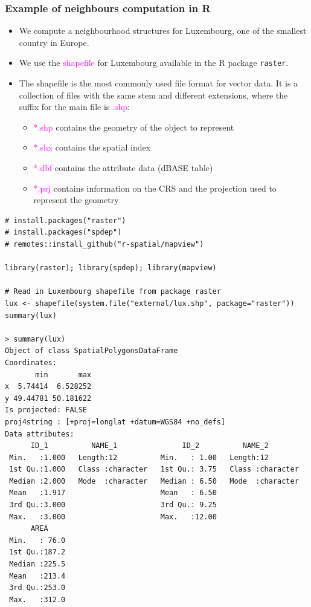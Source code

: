 \documentclass[12pt]{beamer}
\begin{document}
\begin{frame} [fragile]
\frametitle{Example of neighbours computation in R}
 \begin{itemize} \setlength\itemsep{\fill}
\item We compute a neighbourhood structures for Luxembourg, one of the smallest country in Europe.
\item We use the \textcolor{magenta}{shapefile} for Luxembourg available in the R package \texttt{raster}.
\item \normalsize The shapefile is the most commonly used file format for vector data. It is a collection of files with the same stem and different extensions, where the suffix for the main file is \textcolor{magenta}{.shp}:
  \begin{itemize} \setlength\itemsep{\fill}
    \item \textcolor{magenta}{*.shp}  contains the geometry of the object to represent
    \item \textcolor{magenta}{*.shx}  contains the spatial index
    \item \textcolor{magenta}{*.dbf}  contains the attribute data (dBASE table)
    \item \textcolor{magenta}{*.prj}  contains information on the CRS and the projection used to represent the geometry
 \end{itemize}
 \end{itemize}
\end{frame}

\begin{frame} [fragile]
\begin{tiny}
\begin{verbatim}
# install.packages("raster")
# install.packages("spdep")
# remotes::install_github("r-spatial/mapview")

library(raster); library(spdep); library(mapview)

# Read in Luxembourg shapefile from package raster
lux <- shapefile(system.file("external/lux.shp", package="raster"))
summary(lux)

> summary(lux)
Object of class SpatialPolygonsDataFrame
Coordinates:
       min       max
x  5.74414  6.528252
y 49.44781 50.181622
Is projected: FALSE
proj4string : [+proj=longlat +datum=WGS84 +no_defs]
Data attributes:
      ID_1          NAME_1               ID_2          NAME_2
 Min.   :1.000   Length:12          Min.   : 1.00   Length:12
 1st Qu.:1.000   Class :character   1st Qu.: 3.75   Class :character
 Median :2.000   Mode  :character   Median : 6.50   Mode  :character
 Mean   :1.917                      Mean   : 6.50
 3rd Qu.:3.000                      3rd Qu.: 9.25
 Max.   :3.000                      Max.   :12.00
      AREA
 Min.   : 76.0
 1st Qu.:187.2
 Median :225.5
 Mean   :213.4
 3rd Qu.:253.0
 Max.   :312.0

\end{verbatim}
\end{tiny}
\end{frame}
\end{document}
